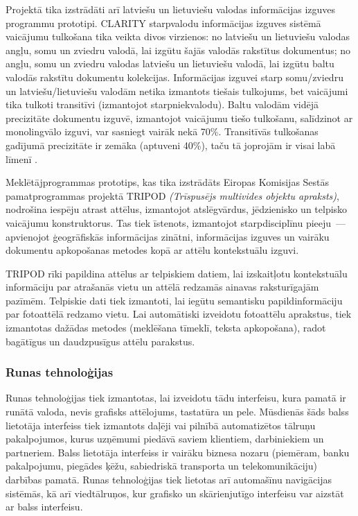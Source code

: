 \begin{multicols}{2}
Projektā tika izstrādāti arī latviešu un lietuviešu valodas informācijas izguves programmu prototipi.  CLARITY starpvalodu informācijas izguves sistēmā vaicājumu tulkošana tika veikta divos virzienos: no latviešu un lietuviešu valodas angļu, somu un zviedru valodā, lai izgūtu šajās valodās rakstītus dokumentus; no angļu, somu un zviedru valodas latviešu un lietuviešu valodā, lai izgūtu baltu valodās rakstītu dokumentu kolekcijas.  Informācijas izguvei starp somu/zviedru un latviešu/lietuviešu valodām netika izmantots tiešais tulkojums, bet vaicājumi tika tulkoti transitīvi (izmantojot starpniekvalodu).  Baltu valodām vidējā precizitāte dokumentu izguvē, izmantojot vaicājumu tiešo tulkošanu, salīdzinot ar monolingvālo izguvi, var sasniegt vairāk nekā 70\%.  Transitīvās tulkošanas gadījumā precizitāte ir zemāka (aptuveni 40\%), taču tā joprojām ir visai labā līmenī \cite{meta18}.

Meklētājprogrammas prototips, kas tika izstrādāts Eiropas Komisijas Sestās pamatprogrammas projektā TRIPOD \textit{(Trīspusējs multivides objektu apraksts)}, nodrošina iespēju atrast attēlus, izmantojot atslēgvārdus, jēdzienisko un telpisko vaicājumu konstruktorus.
Tas tiek īstenots, izmantojot starpdisciplīnu pieeju~--- apvienojot ģeogrāfiskās informācijas zinātni, informācijas izguves un vairāku dokumentu apkopošanas metodes kopā ar attēlu kontekstuālu izguvi. 

TRIPOD rīki papildina attēlus ar telpiskiem datiem, lai izskaitļotu kontekstuālu informāciju par atrašanās \mbox{vietu} un attēlā redzamās ainavas raksturīgajām pazīmēm.
Telpiskie dati tiek izmantoti, lai iegūtu semantisku papildinformāciju par fotoattēlā redzamo vietu.
Lai automātiski izveidotu fotoattēlu aprakstus, tiek izmantotas dažādas metodes (meklēšana tīmeklī, teksta apkopošana), radot bagātīgus un daudzpusīgus attēlu parakstus.
  
\subsubsection{Runas tehnoloģijas}

Runas tehnoloģijas tiek izmantotas, lai izveidotu tādu interfeisu, kura pamatā ir runātā valoda, nevis grafisks attēlojums, tastatūra un pele.  Mūsdienās šāds balss lietotāja interfeiss tiek izmantots daļēji vai pilnībā automatizētos tālruņu pakalpojumos, kurus uzņēmumi piedāvā saviem klientiem, darbiniekiem un partneriem.  Balss lietotāja interfeiss ir vairāku biznesa nozaru (piemēram, banku pakalpojumu, piegādes ķēžu, sabiedriskā transporta un telekomunikāciju) darbības pamatā.  Runas tehnoloģijas tiek lietotas arī automašīnu navigācijas sistēmās, kā arī viedtālruņos, kur grafisko un skārienjutīgo interfeisu var aizstāt ar balss interfeisu.


\end{multicols}

